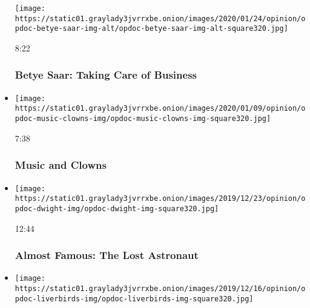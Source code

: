 \begin{itemize}
  \texttt{[image: https://static01.graylady3jvrrxbe.onion/images/2020/01/24/opinion/opdoc-betye-saar-img-alt/opdoc-betye-saar-img-alt-square320.jpg]}

  8:22

  \hypertarget{betye-saar-taking-care-of-business}{%
  \subsubsection{Betye Saar: Taking Care of
  Business}\label{betye-saar-taking-care-of-business}}
\item
  \href{https://www.nytimes3xbfgragh.onion/video/opinion/100000006831435/music-and-clowns.html?action=click\&module=video-series-bar\&region=header\&pgtype=Article\&playlistId=video/op-docs}{}

  \texttt{[image: https://static01.graylady3jvrrxbe.onion/images/2020/01/09/opinion/opdoc-music-clowns-img/opdoc-music-clowns-img-square320.jpg]}

  7:38

  \hypertarget{music-and-clowns}{%
  \subsubsection{Music and Clowns}\label{music-and-clowns}}
\item
  \href{https://www.nytimes3xbfgragh.onion/video/opinion/100000006865864/almost-famous-the-lost-astronaut.html?action=click\&module=video-series-bar\&region=header\&pgtype=Article\&playlistId=video/op-docs}{}

  \texttt{[image: https://static01.graylady3jvrrxbe.onion/images/2019/12/23/opinion/opdoc-dwight-img/opdoc-dwight-img-square320.jpg]}

  12:44

  \hypertarget{almost-famous-the-lost-astronaut}{%
  \subsubsection{Almost Famous: The Lost
  Astronaut}\label{almost-famous-the-lost-astronaut}}
\item
  \href{https://www.nytimes3xbfgragh.onion/video/opinion/100000006865876/almost-famous-the-other-fab-four.html?action=click\&module=video-series-bar\&region=header\&pgtype=Article\&playlistId=video/op-docs}{}

  \texttt{[image: https://static01.graylady3jvrrxbe.onion/images/2019/12/16/opinion/opdoc-liverbirds-img/opdoc-liverbirds-img-square320.jpg]}


\end{itemize}
